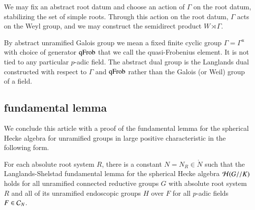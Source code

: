 We may fix an abstract root datum and choose an action of $\Gamma$ on
the root datum, stabilizing the set of simple roots.  Through this
action on the root datum, $\Gamma$ acts on the Weyl group, and we may
construct the semidirect product $W\rtimes \Gamma$.

By abstract unramified Galois group we mean a fixed finite cyclic
group $\Gamma=\Gamma^u$ with choice of generator ${\operatorname{qFrob}}$ that we
call the quasi-Frobenius element.  It is not tied to any particular
$p$-adic field.  The abstract dual group is the Langlands dual
constructed with respect to $\Gamma$ and ${\operatorname{qFrob}}$ rather than the
Galois (or Weil) group of a field.


\subsection{fundamental lemma}

We conclude this article with a proof of the fundamental lemma for the
spherical Hecke algebra for unramified groups in large positive
characteristic in the following form.

\begin{theorem} \label{thm:fl} For each absolute root system $R$,
  there is a constant $N=N_R\in\ring{N}$ such that the
  Langlands-Shelstad fundamental lemma for the spherical Hecke algebra
  $\mathcal H(G//K)$ holds for all unramified
  connected reductive groups $G$ with absolute root system $R$ and all
  of its unramified endoscopic groups $H$ over $F$ for all
  $p$-adic fields $F\in \mathcal C_N$.
\end{theorem}


